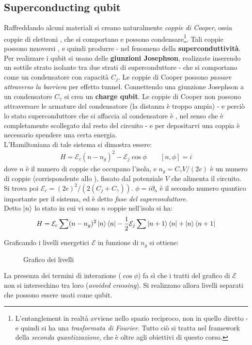 \documentclass[../../InformazioneQuantistica.tex]{subfiles}
\begin{document}
\subsection{Superconducting qubit} 
Raffreddando alcuni materiali si creano naturalmente \textit{coppie di Cooper}, ossia coppie di elettroni , che si comportano  e possono condensare\footnote{L'entanglement in realtà avviene nello spazio reciproco, non in quello diretto - e quindi si ha una \textit{trasformata di Fourier}. Tutto ciò si tratta nel framework della \textit{seconda quantizzazione}, che è oltre agli obiettivi di questo corso.}. Tali coppie possono muoversi , e quindi produrre  - nel fenomeno della \textbf{superconduttività}.\\

Per realizzare i qubit si usano delle \textbf{giunzioni Josephson}, realizzate inserendo un sottile strato isolante tra due strati di superconduttore - che si comportano come un condensatore con capacità $C_j$. Le coppie di Cooper possono \textit{passare attraverso la barriera} per effetto tunnel. Connettendo una giunzione Josephson a un condensatore $C_\gamma$ si crea un \textbf{charge qubit}. Le coppie di Cooper non possono attraversare le armature del condensatore (la distanza è troppo ampia) - e perciò lo stato superconduttore che si affaccia al condensatore è , nel senso che è completamente scollegato dal resto del circuito - e per depositarvi una coppia è necessario spendere una certa energia.\\
L'Hamiltoniana di tale sistema si dimostra essere:
\begin{align*}
H = \mathcal{E}_c (n-n_g)^2 - \mathcal{E}_j \cos\phi \qquad [n,\phi]=i
\end{align*}
dove $n$ è il numero di coppie che occupano l'isola, e $n_g = C_\gamma V/(2e)$ è un numero  di coppie (corrispondente allo ), fissato dal potenziale $V$ che alimenta il circuito. Si trova poi $\mathcal{E}_c = (2e)^2/(2(C_j+C_\gamma))$. $\phi = i\partial_n$ è il secondo numero quantico importante per il sistema, ed è detto \textit{fase del superconduttore}.\\
Detto $\Ket{n}$ lo stato in cui vi sono $n$ coppie nell'isola si ha:
\begin{align*}
H = \mathcal{E}_c \sum (n-n_g)^2 \Ket{n}\Bra{n} - \frac{1}{2}\mathcal{E}_j \sum \Ket{n+1}\Bra{n} + \Ket{n}\Bra{n+1}
\end{align*} 

Graficando i livelli energetici $\mathcal{E}$ in funzione di $n_g$ si ottiene:
\begin{figure}[H]
\centering
[Missing]
\caption{Grafico dei livelli\label{?}}
\end{figure}

La presenza dei termini di interazione ($\cos\phi$) fa sì che i tratti del grafico di $\mathcal{E}$ non si intersechino tra loro (\textit{avoided crossing}). Si realizzano allora livelli separati che possono essere usati come qubit.
\end{document}
